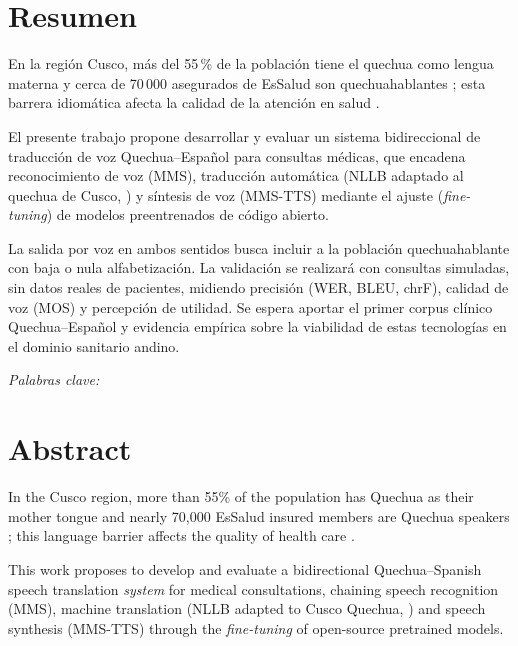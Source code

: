 
\hypersetup{pageanchor=true}

\section*{Resumen}
\singlespacing\noindent
En la regi{\'o}n Cusco, m{\'a}s del 55\,\% de la poblaci{\'o}n tiene el quechua como lengua
materna y cerca de 70\,000 asegurados de EsSalud son quechuahablantes \parencite{essalud2023};
esta barrera idiom{\'a}tica afecta la calidad de la atenci{\'o}n en salud \parencite{begazo2026}.

El presente trabajo propone desarrollar y evaluar un sistema bidireccional de traducci{\'o}n de
voz Quechua--Espa{\~n}ol para consultas m{\'e}dicas, que encadena reconocimiento de voz (MMS),
traducci{\'o}n autom{\'a}tica (NLLB adaptado al quechua de Cusco, ) y s{\'i}ntesis de
voz (MMS-TTS) mediante el ajuste (\emph{fine-tuning}) de modelos preentrenados de c{\'o}digo
abierto.

La salida por voz en ambos sentidos busca incluir a la poblaci{\'o}n quechuahablante con
baja o nula alfabetizaci{\'o}n. La validaci{\'o}n se realizar{\'a} con consultas simuladas, sin datos
reales de pacientes, midiendo precisi{\'o}n (WER, BLEU, chrF), calidad de voz (MOS) y percepci{\'o}n
de utilidad. Se espera aportar el primer corpus cl{\'i}nico Quechua--Espa{\~n}ol y evidencia
emp{\'i}rica sobre la viabilidad de estas tecnolog{\'i}as en el dominio sanitario andino.

\vspace{0.3cm}
\textit{Palabras clave:} 
\onehalfspacing

\newpage
\section*{Abstract}
\singlespacing\noindent
In the Cusco region, more than 55\% of the population has Quechua as their mother tongue and
nearly 70{,}000 EsSalud insured members are Quechua speakers \parencite{essalud2023}; this language
barrier affects the quality of health care \parencite{begazo2026}.

This work proposes to develop and
evaluate a bidirectional Quechua--Spanish speech translation \emph{system} for medical consultations,
chaining speech recognition (MMS), machine translation (NLLB adapted to Cusco Quechua, ) and
speech synthesis (MMS-TTS) through the \emph{fine-tuning} of open-source pretrained models.

